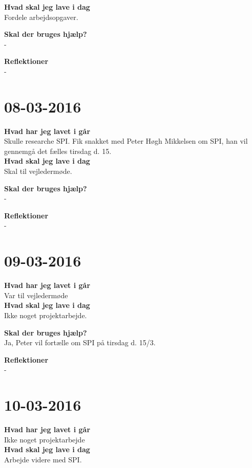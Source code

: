 \documentclass{article}
\begin{document}
	\textbf{Hvad skal jeg lave i dag}\\
	Fordele arbejdsopgaver.     
	
	\textbf{Skal der bruges hjælp?}\\
	- 
	
	\textbf{Reflektioner}\\
	-
	
	\section{08-03-2016}
	
	\textbf{Hvad har jeg lavet i går}\\
	Skulle researche SPI. Fik snakket med Peter Høgh Mikkelsen om SPI, han vil gennemgå det fælles tirsdag d. 15.\\
	
	\textbf{Hvad skal jeg lave i dag}\\
	Skal til vejledermøde.    
	
	\textbf{Skal der bruges hjælp?}\\
	- 
	
	\textbf{Reflektioner}\\
	-
	
	\section{09-03-2016}
	
	\textbf{Hvad har jeg lavet i går}\\
	Var til vejledermøde\\
	
	\textbf{Hvad skal jeg lave i dag}\\
	Ikke noget projektarbejde.    
	
	\textbf{Skal der bruges hjælp?}\\
	Ja, Peter vil fortælle om SPI på tirsdag d. 15/3.
	
	\textbf{Reflektioner}\\
	-

	\section{10-03-2016}
	
	\textbf{Hvad har jeg lavet i går}\\
	Ikke noget projektarbejde\\
	
	\textbf{Hvad skal jeg lave i dag}\\
	Arbejde videre med SPI.    
	
\end{document}
